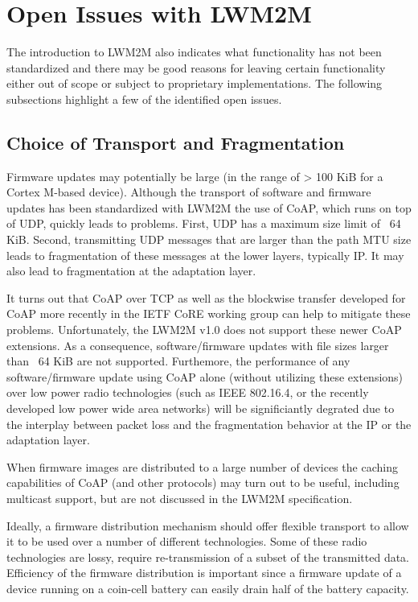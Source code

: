 \documentclass[peerreview, a4paper, 7pt]{IEEEtran}
\begin{document}
\section{Open Issues with LWM2M}
\label{open-issues}
The introduction to LWM2M also indicates what functionality has not been standardized and there may be good reasons for leaving certain functionality either out of scope or subject to proprietary implementations. The following subsections highlight a few of the identified open issues. 

\subsection{Choice of Transport and Fragmentation}

Firmware updates may potentially be large (in the range of > 100 KiB for a Cortex M-based device). Although the transport of software and firmware updates has been standardized with LWM2M the use of CoAP, which runs on top of UDP, quickly leads to problems. First, UDP has a maximum size limit of ~64 KiB. Second, transmitting UDP messages that are larger than the path MTU size leads to fragmentation of these messages at the lower layers, typically IP. It may also lead to fragmentation at the adaptation layer. 

It turns out that CoAP over TCP as well as the blockwise transfer developed for CoAP more recently in the IETF CoRE working group can help to mitigate these problems. Unfortunately, the LWM2M v1.0 does not support these newer CoAP extensions. As a consequence, software/firmware updates with file sizes larger than ~64 KiB are not supported. Furthemore, the performance of any software/firmware update using CoAP alone (without utilizing these extensions) over low power radio technologies (such as IEEE 802.16.4, or the recently developed low power wide area networks) will be significiantly degrated due to the interplay between packet loss and the fragmentation behavior at the IP or the adaptation layer.

When firmware images are distributed to a large number of devices the caching capabilities of CoAP (and other protocols) may turn out to be useful, including multicast support, but are not discussed in the LWM2M specification.

Ideally, a firmware distribution mechanism should offer flexible transport to allow it to be used over a number of different technologies. Some of these radio technologies are lossy, require re-transmission of a subset of the transmitted data. Efficiency of the firmware distribution is important since a firmware update of a device running on a coin-cell battery can easily drain half of the battery capacity. 
\end{document}
